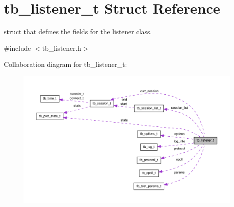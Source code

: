 \hypertarget{structtb__listener__t}{\section{tb\-\_\-listener\-\_\-t Struct Reference}
\label{structtb__listener__t}
}


struct that defines the fields for the listener class.  




{\ttfamily \#include $<$tb\-\_\-listener.\-h$>$}



Collaboration diagram for tb\-\_\-listener\-\_\-t\-:
\nopagebreak
\begin{figure}[H]
\begin{center}
\leavevmode
\includegraphics[width=350pt]{structtb__listener__t__coll__graph}
\end{center}
\end{figure}

